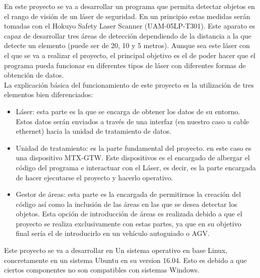 
En este proyecto se va a desarrollar un programa que permita detectar objetos en el rango de visión de un láser de seguridad. En un principio estas medidas serán tomadas con el Hokuyo Safety Laser Scanner (UAM-05LP-T301). Este aparato es capaz de desarrollar tres áreas de detección dependiendo de la distancia a la que detecte un elemento (puede ser de 20, 10 y 5 metros). Aunque sea este láser con el que se va a realizar el proyecto, el principal objetivo es el de poder hacer que el programa pueda funcionar en diferentes tipos de láser con diferentes formas de obtención de datos.\\
La explicación básica del funcionamiento de este proyecto es la utilización de tres elementos bien diferenciados:
\begin{itemize}
    \item Láser: esta parte es la que se encarga de obtener los datos de su entorno. Estos datos serán enviados a través de una interfaz (en nuestro caso u cable ethernet) hacia la unidad de tratamiento de datos.
    \item Unidad de tratamiento: es la parte fundamental del  proyecto. en este caso es una dispositivo MTX‐GTW. Este dispositivos es el encargado de albergar el código del programa e interactuar con el Láser, es decir, es la parte encargada de hacer ejecutarse el proyecto y hacerlo operativo.
    \item Gestor de áreas: esta parte es la encargada de permitirnos la creación del código así como la inclusión de las áreas en las que se desea detectar los objetos. Esta opción de introducción de áreas es realizada debido a que el proyecto se realiza exclusivamente con estas partes, ya que en su objetivo final sería el de introducirlo en un vehículo autoguiado o AGV.\\
\end{itemize}
Este proyecto se va a desarrollar en Un sistema operativo en base Linux, concretamente en un sistema Ubuntu en su version 16.04. Esto es debido a que ciertos componentes no son compatibles con sistemas  Windows.
